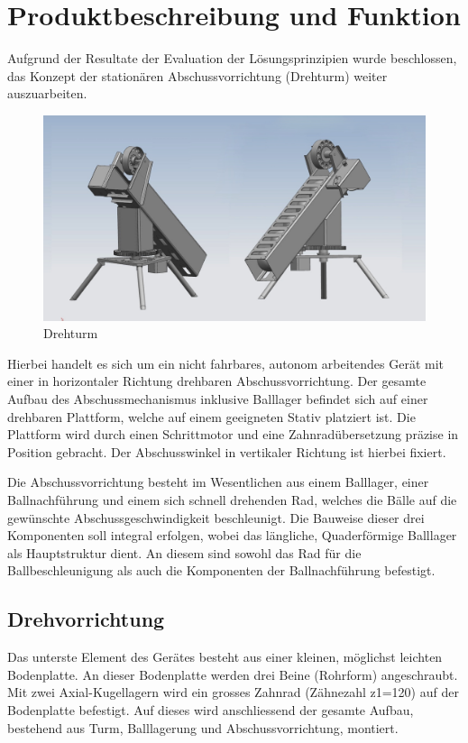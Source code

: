 \section{Produktbeschreibung und Funktion}

Aufgrund der Resultate der Evaluation der Lösungsprinzipien wurde beschlossen, 
das Konzept der stationären Abschussvorrichtung (Drehturm) weiter 
auszuarbeiten. 
\begin{figure}[h!]          
	\centering             
	\includegraphics[width=1.0\textwidth]{fig/Gesamt_bg.jpg}    
	\caption{Drehturm}
	\label{fig:bild} 
\end{figure}

Hierbei handelt es sich um ein nicht fahrbares, autonom arbeitendes Gerät mit 
einer in horizontaler Richtung drehbaren Abschussvorrichtung. Der gesamte Aufbau 
des Abschussmechanismus inklusive Balllager befindet sich auf einer drehbaren 
Plattform, welche auf einem geeigneten Stativ platziert ist. Die Plattform 
wird durch einen Schrittmotor und eine Zahnradübersetzung präzise in Position 
gebracht. Der Abschusswinkel in vertikaler Richtung ist hierbei fixiert. 

Die Abschussvorrichtung besteht im Wesentlichen aus einem Balllager, einer 
Ballnachführung und einem sich schnell drehenden Rad, welches die Bälle auf 
die gewünschte Abschussgeschwindigkeit beschleunigt. Die Bauweise dieser drei 
Komponenten soll integral erfolgen, wobei das längliche, Quaderförmige 
Balllager als Hauptstruktur dient. An diesem sind sowohl das Rad für die 
Ballbeschleunigung als auch die Komponenten der Ballnachführung befestigt.

\subsection{Drehvorrichtung}
Das unterste Element des Gerätes besteht aus einer kleinen, möglichst leichten 
Bodenplatte. An dieser Bodenplatte werden drei Beine (Rohrform) angeschraubt. Mit 
zwei Axial-Kugellagern wird ein grosses Zahnrad (Zähnezahl z1=120) auf der Bodenplatte 
befestigt. Auf dieses wird anschliessend der gesamte Aufbau, bestehend aus Turm, Balllagerung und Abschussvorrichtung, montiert. 

